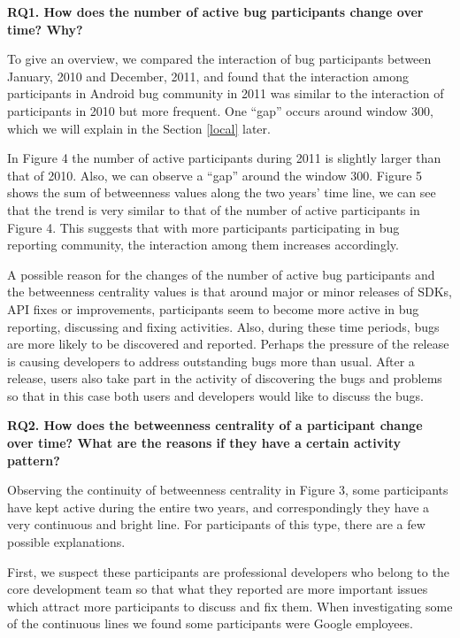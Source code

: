 \documentclass[10pt, conference, compsocconf]{IEEEtran}
\begin{document}
\textbf{RQ1. How does the number of active bug participants change over time? Why?}

To give an overview, we compared the interaction of bug participants
between January, 2010 and December, 2011, and found that the
interaction among participants in Android bug community in 2011 was similar
to the interaction of participants in 2010 but more frequent. One
``gap'' occurs around window 300,
which we will explain in the Section \ref{local} later. 


In Figure 4 the number of active participants
during 2011 is slightly larger than that of 2010. Also, we can observe
a ``gap'' around the window
300. Figure 5 shows the sum of betweenness values along the two years'
time line, we can see that the trend is very similar to that of the
number of active participants in Figure 4. This suggests that with more
participants participating in bug reporting community, the interaction among
them increases accordingly.


A possible reason for the changes of the number of active bug participants
and the betweenness centrality values is that around major or minor
releases of SDKs, API fixes or improvements, participants seem to become more
active in bug reporting, discussing and fixing
activities. Also, during these time periods, bugs are more likely to
be discovered and reported. 
Perhaps the pressure of the release is 
causing developers to address outstanding bugs more than usual.
After a
release, users also take part in the activity of
discovering the bugs and problems so that in this case both users and
developers would like to discuss the bugs. 


\textbf{RQ2. How does the betweenness centrality of a participant change over time? What are the reasons if they have a certain activity pattern?}

Observing the continuity of betweenness centrality in Figure 3, some
participants have kept active during the entire two years, and
correspondingly they have a very continuous and bright line. For
participants of this type, there are a few possible explanations. 

First, we suspect these participants are professional developers who
belong to the core development team so that what they reported are
more important issues which attract more participants to discuss and fix
them. 
When investigating some of the continuous lines we found some
participants were Google employees.
\end{document}
